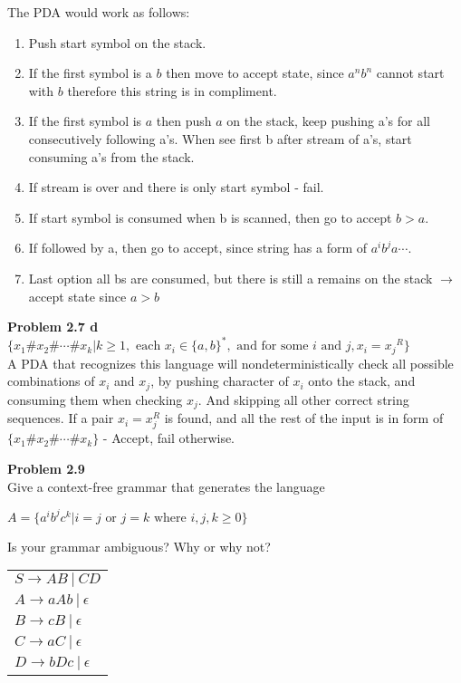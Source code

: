 \documentclass{article}
\newcommand\curl[1]{\{#1\}}
\newcommand{\problem}[1]{\large{\textbf{Problem #1} \\}}
\begin{document}
The PDA would work as follows:\\
\begin{enumerate}[1., leftmargin = 0.8cm]
\itemsep0em
\item Push start symbol on the stack.
\item If the first symbol is a $b$ then move to accept state, since $a^n b^n$ cannot start with $b$
    therefore this string is in compliment.
\item If the first symbol is $a$ then push $a$ on the stack, keep pushing a's for all consecutively 
following a's. When see first b after stream of a's, start consuming a's from the stack.
\item If stream is over and there is only start symbol - fail.
\item If start symbol is consumed when b is scanned, then go to accept $b > a$.
\item If followed by a, then go to accept, since string has a form of  $a^i b^j a \cdots$.
\item Last option all bs are consumed, but there is still a remains on the stack $\rightarrow$ accept state
since $ a > b $
\end{enumerate}


\vspace{0.4cm}

\pagebreak
\problem{2.7 d}
$\{x_1 \# x_2 \# \cdots \# x_k |  k \geq 1, \text{ each }x_i \in \{a,b\}^*,\text{ and for some } i \text{ and } j, x_i 
= {x_j}^R\}$ \\

A PDA that recognizes this language will nondeterministically check all possible combinations of $x_i$ and $x_j$, by pushing
character of $x_i$ onto the stack, and consuming them when checking $x_j$. And skipping all other 
correct string sequences. If a pair $x_i = x^R_j$ is found, and all the rest of the input is in 
form of $\curl{x_1 \# x_2 \# \cdots \# x_k}$ - Accept, fail otherwise.

\vspace{0.4cm}
\problem{2.9}
Give a context-free grammar that generates the language
\begin{center}
$A = \{a^i b^j c^k | i = j \text{ or } j = k \text{ where } i,j,k \geq 0\}$
\end{center}
Is your grammar ambiguous? Why or why not?

\begin{table}[h!]
\centering
\begin{tabular}{l}
$S \rightarrow A B\: | \: C D $\\
$A \rightarrow aAb \: | \: \epsilon $\\
$B \rightarrow cB \: | \: \epsilon $\\
$C \rightarrow aC \: | \: \epsilon $\\
$D \rightarrow bDc \:| \: \epsilon $\\
\end{tabular}
\end{table}
\end{document}
